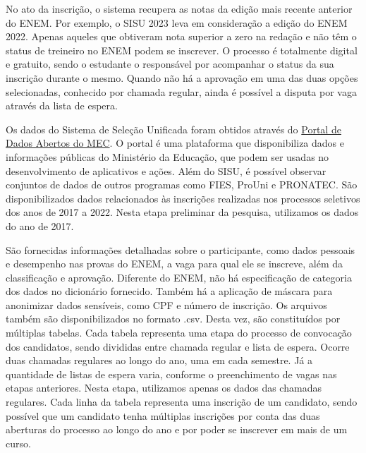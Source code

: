 No ato da inscrição, o sistema recupera as notas da edição mais recente anterior do ENEM. Por exemplo, o SISU 2023 leva em consideração a edição do ENEM 2022. Apenas aqueles que obtiveram nota superior a zero na redação e não têm o status de treineiro no ENEM podem se inscrever. O processo é totalmente digital e gratuito, sendo o estudante o responsável por acompanhar o status da sua inscrição durante o mesmo. Quando não há a aprovação em uma das duas opções selecionadas, conhecido por chamada regular, ainda é possível a disputa por vaga através da lista de espera.

Os dados do Sistema de Seleção Unificada foram obtidos através do \href{https://dadosabertos.mec.gov.br/}{Portal de Dados Abertos do MEC}. O portal é uma plataforma que disponibiliza dados e informações públicas do Ministério da Educação, que podem ser usadas no desenvolvimento de aplicativos e ações. Além do SISU, é possível observar conjuntos de dados de outros programas como FIES, ProUni e PRONATEC. São disponibilizados dados relacionados às inscrições realizadas nos processos seletivos dos anos de 2017 a 2022.  Nesta etapa preliminar da pesquisa, utilizamos os dados do ano de 2017.

São fornecidas informações detalhadas sobre o participante, como dados pessoais e desempenho nas provas do ENEM, a vaga para qual ele se inscreve, além da classificação e aprovação. Diferente do ENEM, não há especificação de categoria dos dados no dicionário fornecido. Também há a aplicação de máscara para anonimizar dados sensíveis, como CPF e número de inscrição. Os arquivos também são disponibilizados no formato .csv. Desta vez, são constituídos por múltiplas tabelas. Cada tabela representa uma etapa do processo de convocação dos candidatos, sendo divididas entre chamada regular e lista de espera. Ocorre duas chamadas regulares ao longo do ano, uma em cada semestre. Já a quantidade de listas de espera varia, conforme o preenchimento de vagas nas etapas anteriores. Nesta etapa, utilizamos apenas os dados das chamadas regulares. Cada linha da tabela representa uma inscrição de um candidato, sendo possível que um candidato tenha múltiplas inscrições por conta das duas aberturas do processo ao longo do ano e por poder se inscrever em mais de um curso.

